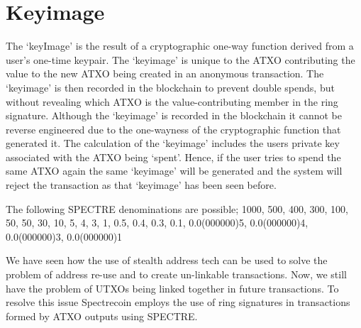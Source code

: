\section{Keyimage}
The ‘keyImage’ is the result of a cryptographic one-way function derived from a user’s one-time keypair. The ‘keyimage’ is unique to the ATXO contributing the value to the new ATXO being created in an anonymous transaction. The ‘keyimage’ is then recorded in the blockchain to prevent double spends, but without revealing which ATXO is the value-contributing member in the ring signature. Although the ‘keyimage’ is recorded in the blockchain it cannot be reverse engineered due to the one-wayness of the 
cryptographic function that generated it. The calculation of the ‘keyimage’ includes the users private key associated with the ATXO being ‘spent’. Hence, if the user tries to spend the same ATXO again the same ‘keyimage’ will be generated and the system will reject the transaction as that ‘keyimage’ has been seen before. 

 

The following SPECTRE denominations are possible; 1000, 500, 400, 300, 100, 50, 50, 30, 10, 5, 4, 3, 1, 0.5, 0.4, 0.3, 0.1, 0.0(000000)5, 0.0(000000)4, 0.0(000000)3, 0.0(000000)1  

 

We have seen how the use of stealth address tech can be used to solve the problem of address re-use and to create un-linkable transactions. Now, we still have the problem of UTXOs being linked together in future transactions. To resolve this issue Spectrecoin employs the use of ring signatures in transactions formed by ATXO outputs using SPECTRE. 